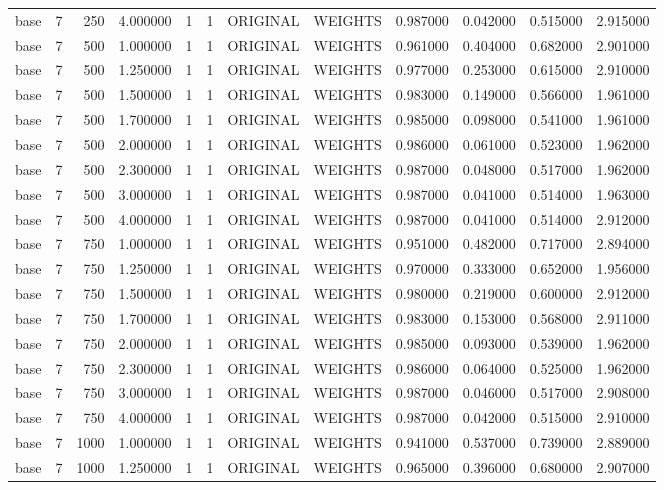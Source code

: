 \begin{tabular}{lrrrllllrrrr}
base & 7 & 250 & 4.000000 & 1 & 1 & ORIGINAL & WEIGHTS & 0.987000 & 0.042000 & 0.515000 & 2.915000 \\
base & 7 & 500 & 1.000000 & 1 & 1 & ORIGINAL & WEIGHTS & 0.961000 & 0.404000 & 0.682000 & 2.901000 \\
base & 7 & 500 & 1.250000 & 1 & 1 & ORIGINAL & WEIGHTS & 0.977000 & 0.253000 & 0.615000 & 2.910000 \\
base & 7 & 500 & 1.500000 & 1 & 1 & ORIGINAL & WEIGHTS & 0.983000 & 0.149000 & 0.566000 & 1.961000 \\
base & 7 & 500 & 1.700000 & 1 & 1 & ORIGINAL & WEIGHTS & 0.985000 & 0.098000 & 0.541000 & 1.961000 \\
base & 7 & 500 & 2.000000 & 1 & 1 & ORIGINAL & WEIGHTS & 0.986000 & 0.061000 & 0.523000 & 1.962000 \\
base & 7 & 500 & 2.300000 & 1 & 1 & ORIGINAL & WEIGHTS & 0.987000 & 0.048000 & 0.517000 & 1.962000 \\
base & 7 & 500 & 3.000000 & 1 & 1 & ORIGINAL & WEIGHTS & 0.987000 & 0.041000 & 0.514000 & 1.963000 \\
base & 7 & 500 & 4.000000 & 1 & 1 & ORIGINAL & WEIGHTS & 0.987000 & 0.041000 & 0.514000 & 2.912000 \\
base & 7 & 750 & 1.000000 & 1 & 1 & ORIGINAL & WEIGHTS & 0.951000 & 0.482000 & 0.717000 & 2.894000 \\
base & 7 & 750 & 1.250000 & 1 & 1 & ORIGINAL & WEIGHTS & 0.970000 & 0.333000 & 0.652000 & 1.956000 \\
base & 7 & 750 & 1.500000 & 1 & 1 & ORIGINAL & WEIGHTS & 0.980000 & 0.219000 & 0.600000 & 2.912000 \\
base & 7 & 750 & 1.700000 & 1 & 1 & ORIGINAL & WEIGHTS & 0.983000 & 0.153000 & 0.568000 & 2.911000 \\
base & 7 & 750 & 2.000000 & 1 & 1 & ORIGINAL & WEIGHTS & 0.985000 & 0.093000 & 0.539000 & 1.962000 \\
base & 7 & 750 & 2.300000 & 1 & 1 & ORIGINAL & WEIGHTS & 0.986000 & 0.064000 & 0.525000 & 1.962000 \\
base & 7 & 750 & 3.000000 & 1 & 1 & ORIGINAL & WEIGHTS & 0.987000 & 0.046000 & 0.517000 & 2.908000 \\
base & 7 & 750 & 4.000000 & 1 & 1 & ORIGINAL & WEIGHTS & 0.987000 & 0.042000 & 0.515000 & 2.910000 \\
base & 7 & 1000 & 1.000000 & 1 & 1 & ORIGINAL & WEIGHTS & 0.941000 & 0.537000 & 0.739000 & 2.889000 \\
base & 7 & 1000 & 1.250000 & 1 & 1 & ORIGINAL & WEIGHTS & 0.965000 & 0.396000 & 0.680000 & 2.907000 \\

\end{tabular}
